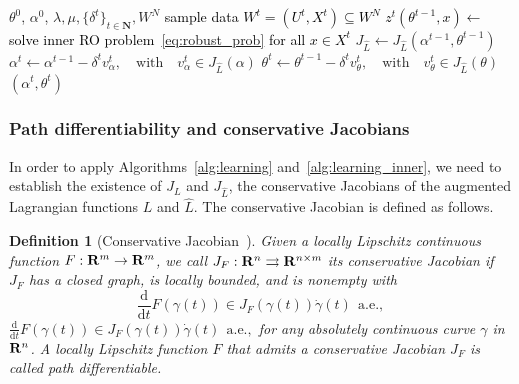 \documentclass[11pt]{article}
\newtheorem{definition}{Definition}[section]
\newcommand{\bsnote}[1]{\noindent\textcolor{red}{\texttt{Bartolomeo: #1}}}
\newcommand{\RC}[1]{\textcolor{black}{#1}}
\begin{document}
\begin{algorithm}[ht]
	\caption{Stochastic gradient descent for the inner loop}
	\label{alg:learning_inner}
	\begin{algorithmic}[1]
	  $\theta^0$, $\alpha^0$, $\lambda, \mu,\{\delta^t\}_{t \in \mathbf{N}}, W^N$
	\State \RC{sample data $W^t = (U^t,X^t) \subseteq W^N$}
	 \State \RC{$z^{t}(\theta^{t-1},x) \gets $ solve inner \gls{RO} problem~\eqref{eq:robust_prob} for all $x \in X^t$}
	 \State $J_{\hat{L}} \gets J_{\hat{L}}(\alpha^{t-1},\theta^{t-1})$  
  \State $\alpha^{t} \gets \alpha^{t-1} - \delta^{t} v_{\alpha}^{t},\quad \text{with}\quad v_{\alpha}^{t} \in J_{\hat{L}}(\alpha)$
\State $\theta^{t} \gets \theta^{t-1} - \delta^t v_{\theta}^{t},\quad \text{with}\quad v_{\theta}^{t} \in J_{\hat{L}}(\theta)$
  \EndFor
	  $(\alpha^t, \theta^t)$
	\end{algorithmic}
\end{algorithm} 

\subsubsection{Path differentiability and conservative Jacobians}
In order to apply Algorithms~\ref{alg:learning} and~\ref{alg:learning_inner}, we need to establish the existence of $J_L$ and $J_{\hat{L}}$, the conservative Jacobians of the augmented Lagrangian functions $L$ and $\hat{L}$. 
The conservative Jacobian is defined as follows. 

\begin{definition}[Conservative Jacobian~\citep{path-diff}]
\label{def:conserve}
Given a locally Lipschitz continuous function $F:{\mathbf R}^{m} \rightarrow {\mathbf R}^m$, we call $J_F:{\mathbf R}^{n} \rightrightarrows {\mathbf R}^{n\times m}$ its {\it conservative Jacobian} if $J_F$ has a closed graph, is locally bounded, and is nonempty with \ifpreprint $$\frac{\text{d}}{\text{d} t}F(\gamma(t))\in J_F(\gamma(t))\dot{\gamma}(t)~~\text{a.e.},$$\else
$\frac{\text{d}}{\text{d} t}F(\gamma(t))\in J_F(\gamma(t))\dot{\gamma}(t)~~\text{a.e.},$
\fi
for any absolutely continuous curve $\gamma$ in ${\mathbf R}^n$. 
A locally Lipschitz function $F$ that admits a conservative Jacobian $J_F$ is called {\it path differentiable}.
\end{definition}
\end{document}
